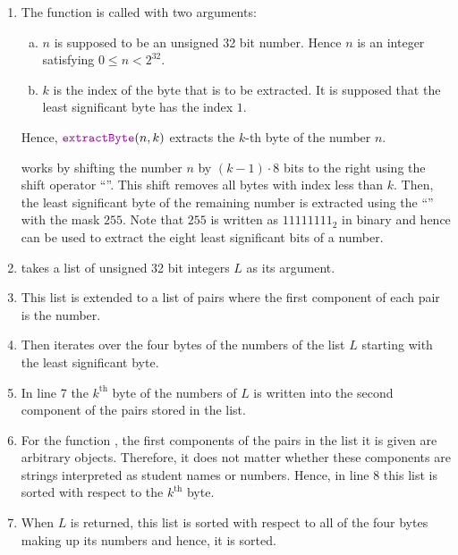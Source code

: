 \begin{enumerate}
\item The function  is called with two arguments:
      \begin{enumerate}[(a)]
      \item $n$ is supposed to be an unsigned 32 bit number.  Hence $n$ is an integer satisfying $0 \leq n < 2^{32}$.
      \item $k$ is the index of the byte that is to be extracted.  It is supposed that the least significant
            byte has the index $1$.
      \end{enumerate}
      Hence, $\mytt{extractByte}(n, k)$ extracts the $k$-th byte of the number $n$.

       works by shifting the number $n$ by $(k-1) \cdot 8$ bits to the right using the shift
      operator ``\mytt{>>}''.  This shift removes all bytes with index less than $k$. Then, the least significant
      byte of the remaining number is extracted using the   ``\mytt{\&}'' with the
      mask $255$.  Note that $255$ is written as $11111111_2$ in binary and hence can be used to extract the
      eight least significant bits of a number. 
\item {} takes a list of unsigned 32 bit integers $L$ as its argument.
\item This list is extended to a list of pairs where the first component of each pair is the number.      
\item Then  iterates over the four bytes of the numbers of the list $L$ starting with the
      least significant byte.
\item In line 7 the $k^\mathrm{th}$ byte of the numbers of $L$ is written into the second component
      of the pairs stored in the list.      
\item For the function , the first components of the pairs in the list it is given are
      arbitrary objects.  Therefore, it does not matter whether these components are strings interpreted as
      student names or numbers.  Hence, in line 8 this list
      is sorted with respect to the $k^\mathrm{th}$ byte.
\item When $L$ is returned, this list is sorted with respect to all of the four bytes making up its numbers and
      hence, it is sorted.
\end{enumerate}

